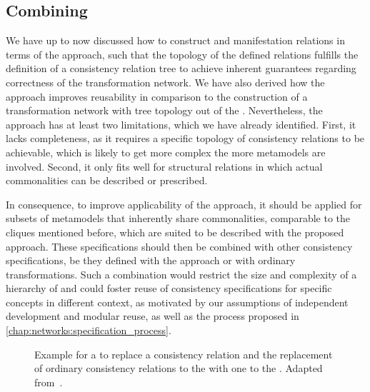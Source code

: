 

\subsection{Combining \Commonalities}

We have up to now discussed how to construct \conceptmetamodels and manifestation relations in terms of the \commonalities approach, such that the topology of the defined relations fulfills the definition of a consistency relation tree to achieve inherent guarantees regarding correctness of the transformation network.
We have also derived how the \commonalities approach improves reusability in comparison to the construction of a transformation network with tree topology out of the \concretemetamodels.
Nevertheless, the approach has at least two limitations, which we have already identified.
First, it lacks completeness, as it requires a specific topology of consistency relations to be achievable, which is likely to get more complex the more metamodels are involved.
Second, it only fits well for structural relations in which actual commonalities can be described or prescribed.

In consequence, to improve applicability of the approach, it should be applied for subsets of metamodels that inherently share commonalities, comparable to the cliques mentioned before, which are suited to be described with the proposed approach.
These specifications should then be combined with other consistency specifications, be they defined with the \commonalities approach or with ordinary transformations.
Such a combination would restrict the size and complexity of a hierarchy of \commonalities and could foster reuse of consistency specifications for specific concepts in different context, as motivated by our assumptions of independent development and modular reuse, as well as the process proposed in \autoref{chap:networks:specification_process}.

\begin{figure}
    \centering
    
    \caption[Partial transformation network of \commonalities]{Example for a \conceptmetamodel to replace a consistency relation and the replacement of ordinary consistency relations to the \concretemetamodels with one to the \conceptmetamodel. Adapted from~.}
    \label{fig:improvement:commonalities_combination_generic}
\end{figure}

